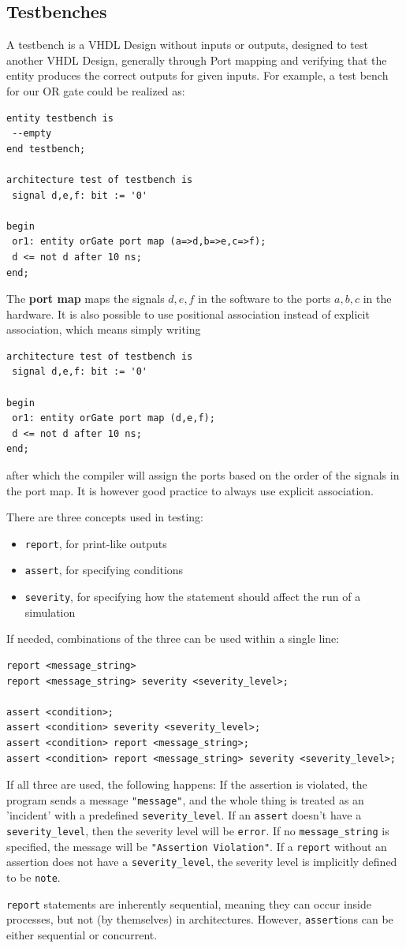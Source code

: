 \documentclass{report}
\newcommand{\tbf}{\textbf}
\newcommand*{\newpar}{\par\vspace{\baselineskip}\noindent} %
\begin{document}
\subsection{Testbenches}
A testbench is a VHDL Design without inputs or outputs, designed to test another VHDL Design, generally through Port mapping and verifying that the entity produces the correct outputs for given inputs. For example, a test bench for our OR gate could be realized as:
\begin{verbatim}
entity testbench is
 --empty
end testbench;

architecture test of testbench is
 signal d,e,f: bit := '0'

begin
 or1: entity orGate port map (a=>d,b=>e,c=>f);
 d <= not d after 10 ns;
end;
\end{verbatim}
The \tbf{port map} maps the signals $d,e,f$ in the software to the ports $a,b,c$ in the hardware. It is also possible to use positional association instead of explicit association, which means simply writing
\begin{verbatim}
architecture test of testbench is
 signal d,e,f: bit := '0'

begin
 or1: entity orGate port map (d,e,f);
 d <= not d after 10 ns;
end;
\end{verbatim}
after which the compiler will assign the ports based on the order of the signals in the port map. It is however good practice to always use explicit association.
\newpar
There are three concepts used in  testing:
\begin{itemize}
 \item \texttt{report}, for print-like outputs
 \item \texttt{assert}, for specifying conditions
 \item \texttt{severity}, for specifying how the statement should affect the run of a simulation
\end{itemize}
If needed, combinations of the three can be used within a single line:
\begin{verbatim}
report <message_string>
report <message_string> severity <severity_level>;

assert <condition>;
assert <condition> severity <severity_level>;
assert <condition> report <message_string>;
assert <condition> report <message_string> severity <severity_level>;
\end{verbatim}
If all three are used, the following happens: If the assertion is violated, the program sends a message \texttt{"message"}, and the whole thing is treated as an 'incident' with a predefined \texttt{severity\_level}. If an \texttt{assert} doesn't have a \texttt{severity\_level}, then the severity level will be \texttt{error}. If no \texttt{message\_string} is specified, the message will be \texttt{"Assertion Violation"}.
 If a \texttt{report} without an assertion does not have a \texttt{severity\_level}, the severity level is implicitly defined to be \texttt{note}.
 \newpar
 \texttt{report} statements are inherently sequential, meaning they can occur inside processes, but not (by themselves) in architectures. However, \texttt{assert}ions can be either sequential or concurrent.
\end{document}
